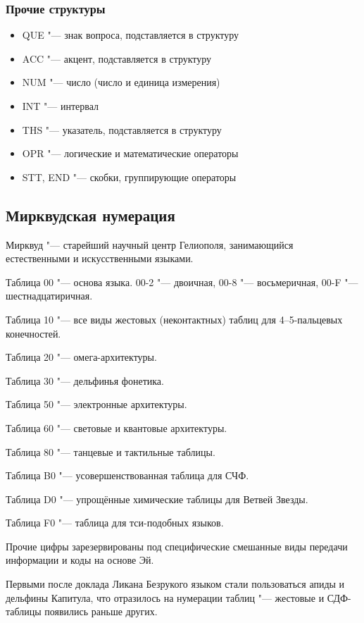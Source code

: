 \subsubsection{Прочие структуры}

\begin{itemize}
\item QUE "--- знак вопроса, подставляется в структуру
\item ACC "--- акцент, подставляется в структуру
\item NUM "--- число (число и единица измерения)
\item INT "--- интервал
\item THS "--- указатель, подставляется в структуру
\item OPR "--- логические и математические операторы
\item STT, END "--- скобки, группирующие операторы
\end{itemize}

\subsection{Мирквудская нумерация}

Мирквуд "--- старейший научный центр Гелиополя, занимающийся естественными и искусственными языками.

Таблица 00 "--- основа языка. 00-2 "--- двоичная, 00-8 "--- восьмеричная, 00-F "--- шестнадцатиричная.

Таблица 10 "--- все виды жестовых (неконтактных) таблиц для 4--5-пальцевых конечностей.

Таблица 20 "--- омега-архитектуры.

Таблица 30 "--- дельфинья фонетика.

Таблица 50 "--- электронные архитектуры.

Таблица 60 "--- световые и квантовые архитектуры.

Таблица 80 "--- танцевые и тактильные таблицы.

Таблица B0 "--- усовершенствованная таблица для СЧФ.

Таблица D0 "--- упрощённые химические таблицы для Ветвей Звезды.

Таблица F0 "--- таблица для тси-подобных языков.

Прочие цифры зарезервированы под специфические смешанные виды передачи информации и коды на основе Эй.

Первыми после доклада Ликана Безрукого языком стали пользоваться апиды и дельфины Капитула, что отразилось на нумерации таблиц "--- жестовые и СДФ-таблицы появились раньше других.


